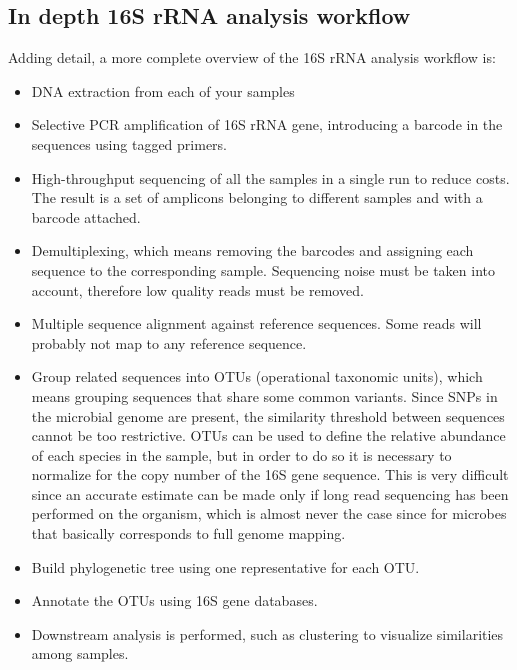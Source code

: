   \subsection{In depth 16S rRNA analysis workflow}
  Adding detail, a more complete overview of the 16S rRNA analysis workflow is:

  \begin{multicols}{2}
    \begin{itemize}
      \item DNA extraction from each of your samples
      \item Selective PCR amplification of 16S rRNA gene, introducing a barcode in the sequences using tagged primers.
      \item High-throughput sequencing of all the samples in a single run to reduce costs.
        The result is a set of amplicons belonging to different samples and with a barcode attached.
      \item Demultiplexing, which means removing the barcodes and assigning each sequence  to the corresponding sample.
        Sequencing noise must be taken into account, therefore low quality reads must be removed.
      \item Multiple sequence alignment against reference sequences.
        Some reads will probably not map to any reference sequence.
      \item Group related sequences into OTUs (operational taxonomic units), which means grouping sequences that share some common variants.
        Since SNPs in the microbial genome are present, the similarity threshold between sequences cannot be too restrictive.
        OTUs can be used to define the relative abundance of each species in the sample, but in order to do so it is necessary to normalize for the copy number of the 16S gene sequence.
        This is very difficult since an accurate estimate can be made only if long read sequencing has been performed on the organism, which is almost never the case since for microbes that basically corresponds to full genome mapping.
      \item Build phylogenetic tree using one representative for each OTU.
      \item Annotate the OTUs using 16S gene databases.
      \item Downstream analysis is performed, such as clustering to visualize similarities among samples.
    \end{itemize}
  \end{multicols}

